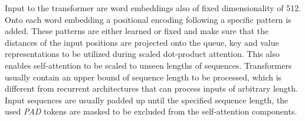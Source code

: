 Input to the transformer are word embeddings also of fixed dimensionality of 512. Onto each word embedding a positional encoding following a specific pattern is added. These patterns are either learned or fixed and make sure that the distances of the input positions are projected onto the queue, key and value representations to be utilized during scaled dot-product attention. This also enables self-attention to be scaled to unseen lengths of sequences. Transformers usually contain an upper bound of sequence length to be pro\-ces\-sed, which is different from recurrent architectures that can process inputs of ar\-bi\-tra\-ry length. Input sequences are usually padded up until the specified sequence length, the used \textit{PAD} tokens are masked to be excluded from the self-attention components. \cite{Alammar2018, Vaswani2017}




\newpage

